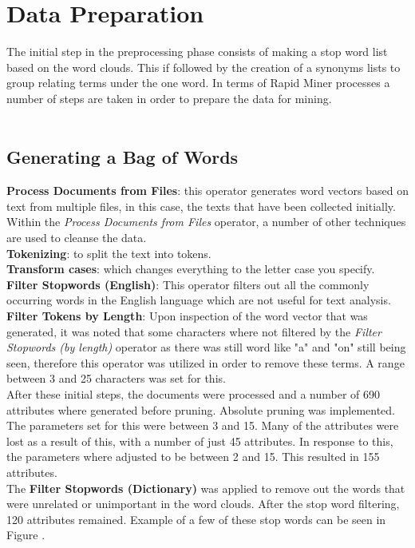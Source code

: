 \newpage

\newpage
\section*{Data Preparation}
The initial step in the preprocessing phase consists of making a stop word list based on the word clouds. This if followed by the creation of a synonyms lists to group relating terms under the one word. In terms of Rapid Miner processes a number of steps are taken in order to prepare the data for mining. \\ \\

\subsection*{Generating a Bag of Words}
\textbf{Process Documents from Files}: this operator generates word vectors based on text from multiple files, in this case, the texts that have been collected initially.  Within the \textit{Process Documents from Files} operator, a number of other techniques are used to cleanse the data.\\
\textbf{Tokenizing}: to split the text into tokens.\\ \textbf{Transform cases}: which changes everything to the letter case you specify.\\
\textbf{Filter Stopwords (English)}: This operator filters out all the commonly occurring words in the English language which are not useful for text analysis.\\
\textbf{Filter Tokens by Length}: Upon inspection of the word vector that was generated, it was noted that some characters where not filtered by the \textit{Filter Stopwords (by length)} operator as there was still word like "a" and "on" still being seen, therefore this operator was utilized in order to remove these terms. A range between 3 and 25 characters was set for this.\\

After these initial steps, the documents were processed and a number of 690 attributes where generated before pruning. Absolute pruning was implemented. The parameters set for this were between 3 and 15. Many of the attributes were lost as a result of this, with a number of just 45 attributes. In response to this, the parameters where adjusted to be between 2 and 15. This resulted in 155 attributes.\\
The \textbf{Filter Stopwords (Dictionary)} was applied to remove out the words that were unrelated or unimportant in the word clouds. After the stop word filtering, 120 attributes remained. Example of a few of these stop words can be seen in Figure .


